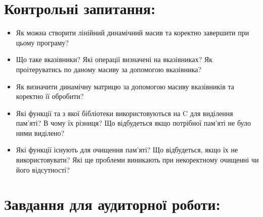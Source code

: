 \documentclass[a5paper,titlepage,openany,twoside,
]
{book_unv}%
\begin{document}
\section{Контрольні запитання:}
\begin{itemize}
\item
  Як можна створити лінійний динамічний масив та коректно завершити при
  цьому програму?
\item
  Що таке вказівники? Які операції визначені на вказівниках? Як
  проітеруватись по даному масиву за допомогою вказівника?
\item
  Як визначити динамічну матрицю за допомогою масиву вказівників та
  коректно її обробити?
\item
  Які функції та з якої бібліотеки використовуються на C для виділення
  пам'яті? В чому їх різниця? Що відбудеться якщо потрібної пам'яті не
  було ними виділено?
\item
  Які функції існують для очищення пам'яті? Що відбудеться, якщо їх не
  використовувати? Які ще проблеми виникають при некоректному очищенні
  чи його відсутності?
\end{itemize}

\section{Завдання для аудиторної роботи:}
\end{document}

